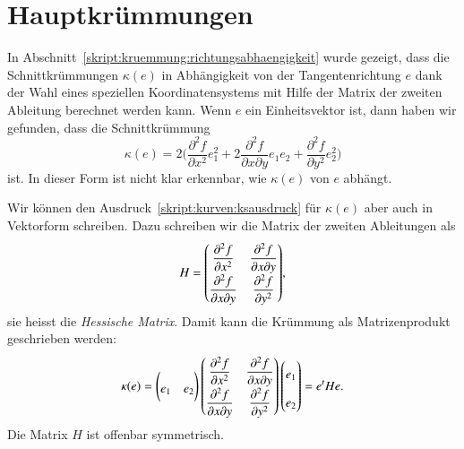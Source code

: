 %
%
%
\section{Hauptkrümmungen%
\label{skript:kurven:section:hauptkruemmungen}}
In Abschnitt~\ref{skript:kruemmung:richtungsabhaengigkeit} wurde gezeigt,
dass die Schnittkrümmungen $\kappa(e)$ in Abhängigkeit von der
Tangentenrichtung $e$ dank der Wahl eines speziellen Koordinatensystems
mit Hilfe der Matrix der zweiten Ableitung berechnet werden kann.
Wenn $e$ ein Einheitsvektor ist, dann haben wir gefunden, dass die
Schnittkrümmung
\begin{equation}
\kappa(e)
=
2\biggl(
\frac{\partial^2 f}{\partial x^2}
e_1^2
+
2
\frac{\partial^2 f}{\partial x\partial y}e_1e_2
+
\frac{\partial^2 f}{\partial y^2}e_2^2
\biggr)
\label{skript:kurven:ksausdruck}
\end{equation}
ist.
In dieser Form ist nicht klar erkennbar, wie $\kappa(e)$ von $e$ abhängt.

Wir können den Ausdruck~\eqref{skript:kurven:ksausdruck} für
$\kappa(e)$ aber auch in Vektorform schreiben.
Dazu schreiben wir die Matrix der zweiten Ableitungen als
\[
H
=
{\def\arraystretch{1.9}
\begin{pmatrix}
\displaystyle\frac{\partial^2 f}{\partial x^2}&
\displaystyle\frac{\partial^2 f}{\partial x\partial y}\\
\displaystyle\frac{\partial^2 f}{\partial x\partial y}&
\displaystyle\frac{\partial^2 f}{\partial y^2}
\end{pmatrix}},
\]
sie heisst die {\em Hessische Matrix}.
%
%
Damit kann die Krümmung als Matrizenprodukt geschrieben werden:
\[
\kappa(e)
=
\begin{pmatrix}e_1&e_2\end{pmatrix}
{\def\arraystretch{1.9}
\begin{pmatrix}
\displaystyle\frac{\partial^2 f}{\partial x^2}&
\displaystyle\frac{\partial^2 f}{\partial x\partial y}\\
\displaystyle\frac{\partial^2 f}{\partial x\partial y}&
\displaystyle\frac{\partial^2 f}{\partial y^2}
\end{pmatrix}}
\begin{pmatrix}e_1\\e_2\end{pmatrix}
=
e^tHe.
\]
Die Matrix $H$ ist offenbar symmetrisch.

